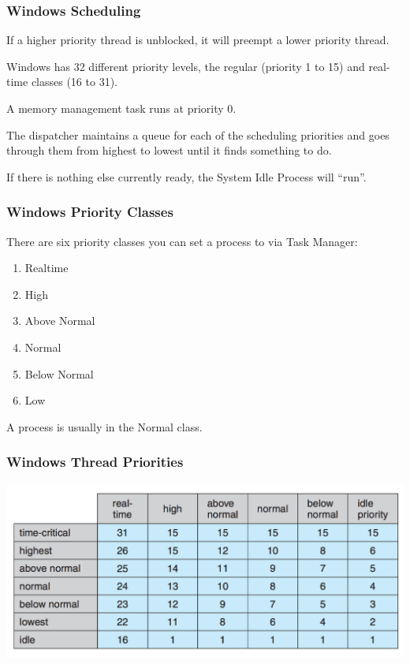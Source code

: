 \begin{frame}
\frametitle{Windows Scheduling}

If a higher priority thread is unblocked, it will preempt a lower priority thread. 

Windows has 32 different priority levels, the regular (priority 1 to 15) and real-time classes (16 to 31). 

A memory management task runs at priority 0.

The dispatcher maintains a queue for each of the scheduling priorities and goes through them from highest to lowest until it finds something to do.

If there is nothing else currently ready, the System Idle Process will ``run''.

\end{frame}

\begin{frame}
\frametitle{Windows Priority Classes}

There are six priority classes you can set a process to via Task Manager:

\begin{enumerate}
	\item Realtime
	\item High
	\item Above Normal
	\item Normal
	\item Below Normal
	\item Low
\end{enumerate}

A process is usually in the Normal class.

\end{frame}

\begin{frame}
\frametitle{Windows Thread Priorities}

\begin{center}
	\includegraphics[width=\textwidth]{images/windows-thread-priorities.png}
\end{center}

\end{frame}

